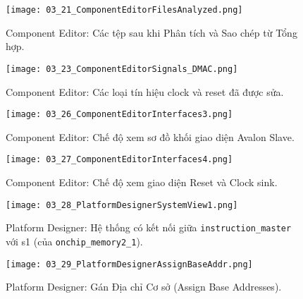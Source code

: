 \begin{figure}[htbp] \centering \texttt{[image: 03\_21\_ComponentEditorFilesAnalyzed.png]} \caption{Component Editor: Các tệp sau khi Phân tích và Sao chép từ Tổng hợp.} \label{fig:03_21} \end{figure}
\begin{figure}[htbp] \centering \texttt{[image: 03\_23\_ComponentEditorSignals\_DMAC.png]} \caption{Component Editor: Các loại tín hiệu clock và reset đã được sửa.} \label{fig:03_23} \end{figure}
\begin{figure}[htbp] \centering \texttt{[image: 03\_26\_ComponentEditorInterfaces3.png]} \caption{Component Editor: Chế độ xem sơ đồ khối giao diện Avalon Slave.} \label{fig:03_26} \end{figure}
\begin{figure}[htbp] \centering \texttt{[image: 03\_27\_ComponentEditorInterfaces4.png]} \caption{Component Editor: Chế độ xem giao diện Reset và Clock sink.} \label{fig:03_27} \end{figure}
\begin{figure}[htbp] \centering \texttt{[image: 03\_28\_PlatformDesignerSystemView1.png]} \caption{Platform Designer: Hệ thống có kết nối giữa \texttt{instruction\_master} với s1 (của \texttt{onchip\_memory2\_1}).} \label{fig:03_28} \end{figure}
\begin{figure}[htbp] \centering \texttt{[image: 03\_29\_PlatformDesignerAssignBaseAddr.png]} \caption{Platform Designer: Gán Địa chỉ Cơ sở (Assign Base Addresses).} \label{fig:03_29} \end{figure}
